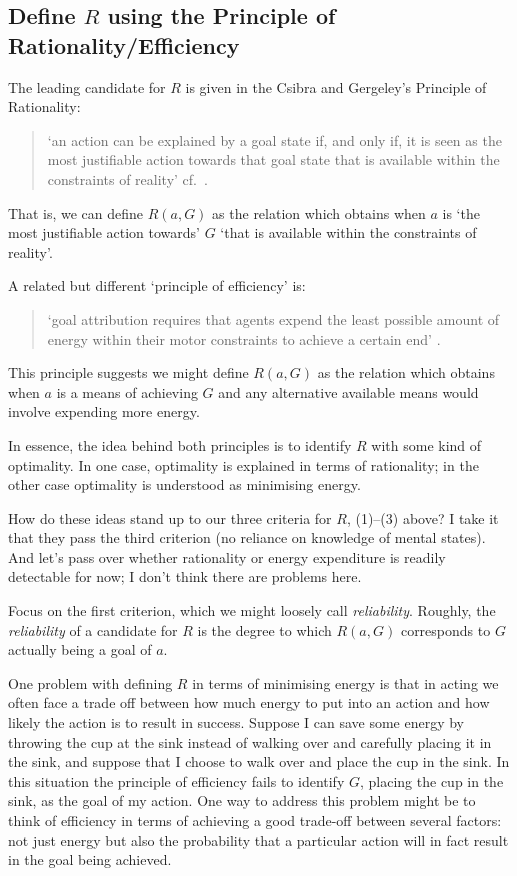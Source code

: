 \documentclass[12pt,\papersize]{extarticle}
\begin{document}
\subsection{Define $R$ using the Principle of Rationality/Efficiency}
The leading candidate for $R$ is given in the Csibra and Gergeley's Principle of Rationality:
%
\begin{quote}
`an action can be explained by a goal state if, and only if, it is seen as the most justifiable action towards that goal state that is available within the constraints of reality' \citep[p.\ 255]{Csibra:1998cx} cf.\ \citep{Csibra:2003jv}.
\end{quote}
%
That is, we can define $R(a,G)$ as the relation which obtains when $a$ is `the most justifiable action towards' $G$ `that is available within the constraints of reality'.

A related but different `principle of efficiency' is:
%
\begin{quote}
`goal attribution requires that agents expend the least possible amount of energy within their motor constraints to achieve a certain end' \citep[p.\ 1061]{Southgate:2008el}.
\end{quote}
%
This principle suggests we might define $R(a,G)$ as the relation which obtains when $a$ is a means of achieving $G$ and any alternative available means would involve expending more energy.

In essence, the idea behind both principles is to identify $R$ with some kind of optimality.
In one case, optimality is explained in terms of rationality; in the other case optimality is understood as minimising energy.

How do these ideas stand up to our three criteria for $R$, (1)--(3) above?
I take it that they pass the third criterion (no reliance on knowledge of mental states).
And let's pass over whether rationality or energy expenditure is readily detectable for now; I don't think there are problems here.  

Focus on the first criterion, which we might loosely call \emph{reliability}. 
Roughly, the \emph{reliability} of a candidate for $R$ is the degree to which $R(a,G)$ corresponds to $G$ actually being a goal of $a$.

One problem with defining $R$ in terms of minimising energy is that in acting we often face a trade off between how much energy to put into an action and how likely the action is to result in success.
Suppose I can save some energy by throwing the cup at the sink instead of walking over and carefully placing it in the sink,
and suppose that I choose to walk over and place the cup in the sink.
In this situation the principle of efficiency fails to identify $G$, placing the cup in the sink, as the goal of my action.
One way to address this problem might be to think of efficiency in terms of achieving a good trade-off between several factors:
not just energy but also the probability that a particular action will in fact result in the goal being achieved.
\end{document}
